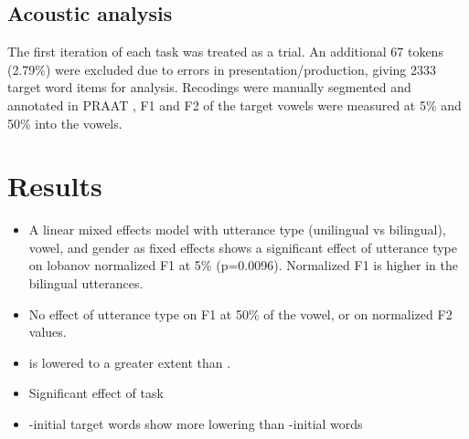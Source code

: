 \documentclass[11pt]{article}
\newcommand{\nt}[1]{\textipa{[#1]}} %
\newcommand{\wt}[1]{\textipa{/#1/}} %
\begin{document}
\subsection{Acoustic analysis}
 The first iteration of each task was treated as a trial. An additional 67 tokens (2.79\%) were excluded due to errors in presentation/production, giving 2333 target word items for analysis. Recodings were manually segmented and annotated in PRAAT \cite{boersma2016praat}, F1 and F2 of the target vowels \nt{2, ae} were measured at 5\% and 50\% into the vowels. 


\section{Results} %
\begin{itemize}
	\item A linear mixed effects model with utterance type (unilingual vs bilingual), vowel, and gender as fixed effects shows a significant effect of utterance type on lobanov normalized F1 at 5\% (p=0.0096). Normalized F1 is higher in the bilingual utterances.
	
	\item No effect of utterance type on F1 at 50\% of the vowel, or on normalized F2 values.
	
	\item \nt{2} is lowered to a greater extent than \nt{\ae}. 
	
	\item Significant effect of task 
	
	\item \wt{d}-initial target words show more lowering than \wt{b}-initial words %
	
\end{itemize}

  
\end{document}
